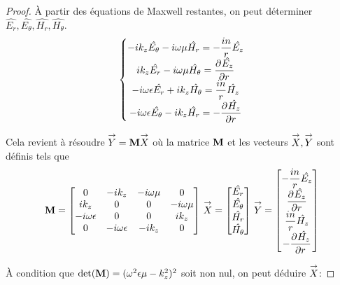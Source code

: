   \begin{proof}
    À partir des équations de Maxwell restantes, on peut déterminer \(\hat{E_r},\hat{E_\theta},\hat{H_r},\hat{H_\theta}\).
    \begin{equation}
      \left\lbrace
      \begin{matrix}
        -ik_z\hat{E_\theta} - i\w\mu \hat{H_r} = -\frac{in}{r}\hat{E_z}
        \\
        ik_z\hat{E_r} - i\w\mu \hat{H_\theta} = \ddr{r}{\hat{E_z}}
        \\
        -i\w\eps \hat{E_r} + ik_z \hat{H_\theta} = \frac{in}{r}\hat{H_z}
        \\
        -i\w\eps \hat{E_\theta} - ik_z \hat{H_r} = -\ddr{r}{\hat{H_z}}
      \end{matrix}
      \right.
    \end{equation}

    Cela revient à résoudre \(\vect{Y} = \mat{M}\vect{X}\) où la matrice \(\mat{M}\) et les vecteurs \(\vect{X}, \vect{Y}\) sont définis tels que
    \begin{equation}
      \mat{M} =
      \begin{bmatrix}
      0 & -ik_z & -i\w\mu & 0
      \\
      ik_z & 0 & 0 & -i\w\mu
      \\
      -i\w\eps & 0 & 0 & ik_z
      \\
      0 & -i\w\eps & -ik_z & 0
      \end{bmatrix}
      \,
      \vect{X} =
      \begin{bmatrix}
        \hat{E_r}\\
        \hat{E_\theta}\\
        \hat{H_r}\\
        \hat{H_\theta}
      \end{bmatrix}
      \,
      \vect{Y} =
      \begin{bmatrix}
        -\frac{in}{r}\hat{E_z}\\
        \ddr{r}{\hat{E_z}}\\
        \frac{in}{r}\hat{H_z}\\
        -\ddr{r}{\hat{H_z}}
      \end{bmatrix}
    \end{equation}

    À condition que \(\det(\mat{M}) = (\w^2\eps\mu-k_z^2)^2\) soit non nul, on peut déduire \(\vect{X}\):


\end{proof}
